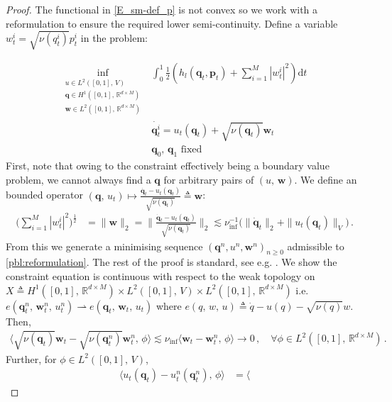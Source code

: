 \documentclass[runningheads]{llncs}
\newcommand{\half}{\frac 12}
\newcommand{\norm}[2]{\| #1 \|_{ #2 }}
\newcommand{\vnorm}[1]{\norm{ #1 }{V}}
\newcommand{\ltwonorm}[1]{\norm{ #1 }{2}}
\newcommand{\diff}[1]{\text{d} #1}
\newcommand{\RdM}{\mathbb{R}^{d\times M}}
\newcommand{\nuinf}{\nu_\text{inf}}
\begin{document}
\begin{proof}
The functional in \eqref{E_sm-def_p} is not convex so we work with a
reformulation to ensure the required lower semi-continuity. Define a
variable $w^i_t = \sqrt{\nu(q_t^i)} p^i_t$ in the problem:

\begin{align*}
\inf_{\substack{u \in L^2([0,1],\,V)\\ \mathbf q\in H^1([0,1],\,\RdM)\\\mathbf w\in L^2([0,1],\,\RdM)}}
    & \int_0^1\half\left (h_l(\mathbf q_t,\mathbf p_t) + \sum_{i=1}^M |w_t^i|^2\right )\diff{t}\\
    & \dot{\mathbf q_t^i} = u_t(\mathbf q_t) + \sqrt{\nu(\mathbf q_t)} \mathbf w_t\\
    & \mathbf q_0,\,\mathbf q_1\text{ fixed}
  \label{pbl:reformulation}
\end{align*}
First, note that owing to
the constraint effectively being a boundary value problem, we cannot always find
a $\mathbf q$ for arbitrary pairs of $(u,\,\mathbf w)$. We define an bounded operator
$(\mathbf q,\, u_t)\mapsto \frac{\dot{\mathbf q_t} - u_t(\mathbf
q_t)}{\sqrt{\nu(\mathbf q_t)}} \triangleq \mathbf w$:
\begin{align*}
\Big(\sum_{i=1}^M |w_t^i|^2\Big)^{\frac 12} & = \ltwonorm{\mathbf w} =
\ltwonorm{\frac{\dot{\mathbf q}_t - u_t(\mathbf q_t)}{\sqrt{\nu(\mathbf q_t)}}}
\lesssim \nuinf^{-1}\Big(\ltwonorm{\dot{\mathbf q}_t} + \vnorm{u_t(\mathbf
q_t)}\Big)\,.
\end{align*}
From this we generate a minimising sequence $(\mathbf q^n, u^n, \mathbf
w^n)_{n\geq 0}$ admissible to \eqref{pbl:reformulation}. The rest of the proof
is standard, see e.g. \cite{younes2010shapes}. We show the constraint equation
is continuous with respect to the weak topology on $X\triangleq
H^1([0,1],\,\RdM)\times L^2([0,1],\,V)\times L^2([0,1],\,\RdM)$ i.e.  $e(\mathbf
q_t^n,\,\mathbf w_t^n,\, u_t^n)\rightharpoonup e(\mathbf q_t,\,\mathbf
w_t,\, u_t)$ where $e(q,\,w,\,u) \triangleq \dot{q} - u(q) -
\sqrt{\nu(q)}w$. Then,
\begin{align*}
\langle\sqrt{\nu(\mathbf q_t)}\mathbf w_t - \sqrt{\nu(\mathbf q_t^n)}\mathbf w_t^n,\,\phi\rangle \lesssim \nuinf\langle
\mathbf w_t - \mathbf w_t^n,\,\phi\rangle \rightarrow 0\,,\quad \forall \phi \in
L^2([0,1],\,\RdM)\,.
\end{align*}
Further, for $\phi\in L^2([0,1],\,V)$,
\begin{align*}
\langle u_t(\mathbf q_t)-u_t^n(\mathbf q_t^n),\,\phi\rangle & = \langle

\end{align*}
\end{proof}
\end{document}
